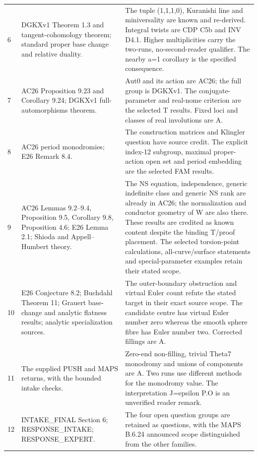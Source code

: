 \documentclass[11pt,a4paper]{article}
\theoremstyle{plain}
\theoremstyle{definition}
\begin{document}
\begin{longtable}{@{}L{.05\linewidth}L{.34\linewidth}L{.56\linewidth}@{}}
6 & DGKXv1 Theorem 1.3 and tangent-cohomology theorem; standard proper base change and relative duality. & The tuple (1,1,1,0), Kuranishi line and miniversality are known and re-derived. Integral twists are CDP C5b and INV D4.1. Higher multiplicities carry the two-runs, no-second-reader qualifier. The nearby a=1 corollary is the specified consequence.\\
7 & AC26 Proposition 9.23 and Corollary 9.24; DGKXv1 full-automorphisms theorem. & Aut0 and its action are AC26; the full group is DGKXv1. The conjugate-parameter and real-nome criterion are the selected T results. Fixed loci and classes of real involutions are A.\\
8 & AC26 period monodromies; E26 Remark 8.4. & The construction matrices and Klingler question have source credit. The explicit index-12 subgroup, maximal proper-action open set and period embedding are the selected FAM results.\\
9 & AC26 Lemmas 9.2--9.4, Proposition 9.5, Corollary 9.8, Proposition 4.6; E26 Lemma 2.1; Shioda and Appell--Humbert theory. & The NS equation, independence, generic indefinite class and generic NS rank are already in AC26; the normalization and conductor geometry of W are also there. These results are credited as known content despite the binding T/\allowbreak{}proof placement. The selected torsion-point calculations, all-curve/\allowbreak{}surface statements and special-parameter examples retain their stated scope.\\
10 & E26 Conjecture 8.2; Buchdahl Theorem 11; Grauert base-change and analytic flatness results; analytic specialization sources. & The outer-boundary obstruction and virtual Euler count refute the stated target in their exact source scope. The candidate centre has virtual Euler number zero whereas the smooth sphere fibre has Euler number two. Corrected fillings are A.\\
11 & The supplied PUSH and MAPS returns, with the bounded intake checks. & Zero-end non-filling, trivial Theta7 monodromy and unions of components are A. Two runs use different methods for the monodromy value. The interpretation J=epsilon P.O is an unverified reader remark.\\
12 & INTAKE\_\allowbreak{}FINAL Section 6; RESPONSE\_\allowbreak{}INTAKE; RESPONSE\_\allowbreak{}EXPERT. & The four open question groups are retained as questions, with the MAPS B.6.24 announced scope distinguished from the other families.\\
\bottomrule\end{longtable}\endgroup
\end{document}
